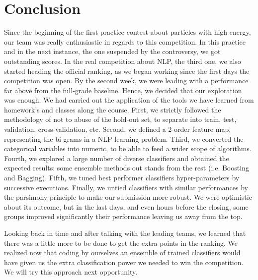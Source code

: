 \chapter{Conclusion}\label{ch:conclusion}

Since the beginning of the first practice contest about particles with high-energy, our team was really enthusiastic in regards to this competition. In this practice and in the next instance, the one suspended by the controversy, we got outstanding scores. In the real competition about NLP, the third one, we also started heading the official ranking, as we began working since the first days the competition was open. By the second week, we were leading with a performance far above from the full-grade baseline. Hence, we decided that our exploration was enough. We had carried out the application of the tools we have learned from homework's and classes along the course. First, we strictly followed the methodology of not to abuse of the hold-out set, to separate into train, test, validation, cross-validation, etc. Second, we defined a 2-order feature map, representing the bi-grams in a NLP learning problem. Third, we converted the categorical variables into numeric, to be able to feed a wider scope of algorithms. Fourth, we explored a large number of diverse classifiers and obtained the expected results: some ensemble methods out stands from the rest (i.e. Boosting and Bagging). Fifth, we tuned best performer classifiers hyper-parameters by successive executions. Finally, we untied classifiers with similar performances by the parsimony principle to make our submission more robust. We were optimistic about its outcome, but in the last days, and even hours before the closing, some groups improved significantly their performance leaving us away from the top.

Looking back in time and after talking with the leading teams, we learned that there was a little more to be done to get the extra points in the ranking. We realized now that coding by ourselves an ensemble of trained classifiers would have given us the extra classification power we needed to win the competition. We will try this approach next opportunity. 
